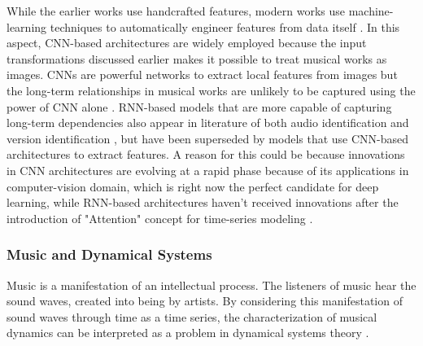 \documentclass[../main.tex]{subfiles}
\begin{document}
\par
While the earlier works use handcrafted features, modern works use machine-learning techniques to automatically engineer features from data itself \cite{arcas_now_2017}\cite{yuTemporalPyramidPooling2019}\cite{baez_suarez_unsupervised_2020}\cite{yu_contrastive_2020}\cite{dorasCoverDetectionUsing2019}\cite{jiang_yang_chen_2020}\cite{yesilerAccurateScalableVersion2020}\cite{yesilerLessMoreFaster2020}\cite{yeSupervisedDeepHashing2019b}\cite{yuTemporalPyramidPooling2019}. In this aspect, \gls{CNN}-based architectures are widely employed because the input transformations discussed earlier makes it possible to treat musical works as images. \gls{CNN}s are powerful networks to extract local features from images but the long-term relationships in musical works are unlikely to be captured using the power of \gls{CNN} alone \cite{yesilerAccurateScalableVersion2020}. \gls{RNN}-based models that are more capable of capturing long-term dependencies also appear in literature of both audio identification \cite{baez_suarez_unsupervised_2020} and version identification \cite{yeSupervisedDeepHashing2019b}, but have been superseded by models that use \gls{CNN}-based architectures to extract features. A reason for this could be because innovations in \gls{CNN} architectures are evolving at a rapid phase because of its applications in computer-vision domain, which is right now the perfect candidate for deep learning, while \gls{RNN}-based architectures haven't received innovations after the introduction of "Attention" concept for time-series modeling \cite{vaswaniAttentionAllYou2017}.

\subsubsection{Music and Dynamical Systems}

\par
Music is a manifestation of an intellectual process. The listeners of music hear the sound waves, created into being by artists. By considering this manifestation of sound waves through time as a time series, the characterization of musical dynamics can be interpreted as a problem in dynamical systems theory \cite{complex_dynamics}. 
\end{document}
